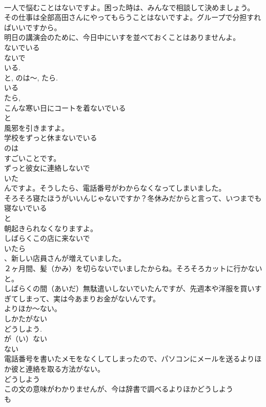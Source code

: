 \documentclass[8pt]{extreport}
\begin{document}
\begin{CJK}{UTF8}{min}
\\	一人で悩むことはないですよ。困った時は、みんなで相談して決めましょう。
\\	その仕事は全部高田さんにやってもらうことはないですよ。グループで分担すればいいですから。
\\	明日の講演会のために、今日中にいすを並べておくことはありませんよ。
\\	ないでいる
\\	ないで 
\\	いる. 
\\	と, のは～, たら.
\\	いる 
\\	たら, 
\\	こんな寒い日にコートを着ないでいる
\\	と
\\	風邪を引きますよ。
\\	学校をずっと休まないでいる
\\	のは
\\	すごいことです。
\\	ずっと彼女に連絡しないで
\\	いた
\\	んですよ。そうしたら、電話番号がわからなくなってしまいました。
\\	そろそろ寝たほうがいいんじゃないですか？冬休みだからと言って、いつまでも寝ないでいる
\\	と
\\	朝起きられなくなりますよ。
\\	しばらくこの店に来ないで
\\	いたら
\\	、新しい店員さんが増えていました。
\\	２ヶ月間、髪（かみ）を切らないでいましたからね。そろそろカットに行かないと。
\\	しばらくの間（あいだ）無駄遣いしないでいたんですが、先週本や洋服を買いすぎてしまって、実は今あまりお金がないんです。	
\\	よりほか～ない。
\\	しかたがない 
\\	どうしよう.
\\	が（い）ない 
\\	ない 
\\	電話番号を書いたメモをなくしてしまったので、パソコンにメールを送るよりほか彼と連絡を取る方法がない。
\\	どうしよう 
\\	この文の意味がわかりませんが、今は辞書で調べるよりほかどうしよう
\\	も

\end{CJK}
\end{document}
